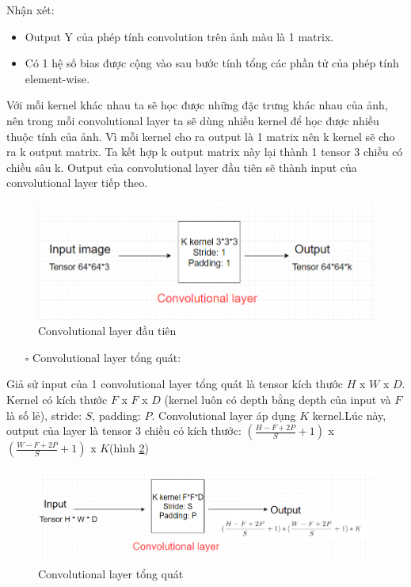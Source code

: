 Nhận xét:
\begin{itemize}
\item Output Y của phép tính convolution trên ảnh màu là 1 matrix.
\item Có 1 hệ số bias được cộng vào sau bước tính tổng các phần tử của phép tính element-wise.
\end{itemize}

Với mỗi kernel khác nhau ta sẽ học được những đặc trưng khác nhau của ảnh, nên trong mỗi convolutional layer ta sẽ dùng nhiều kernel để học được nhiều thuộc tính của ảnh. Vì mỗi kernel cho ra output là 1 matrix nên k kernel sẽ cho ra k output matrix. Ta kết hợp k output matrix này lại thành 1 tensor 3 chiều có chiều sâu k. Output của convolutional layer đầu tiên sẽ thành input của convolutional layer tiếp theo.

\FloatBarrier
\begin{figure}[htp]
\begin{center}
\includegraphics[scale=0.8]{chap2/c2_figs/15.png}
\end{center}
\caption{Convolutional layer đầu tiên}
\label{fig:conv-firstlayer}
\end{figure}
\FloatBarrier

\begin{itemize}
\item[$\square$] Convolutional layer tổng quát:
\end{itemize}
Giả sử input của 1 convolutional layer tổng quát là tensor kích thước $H$ x $W$ x $D$. Kernel có kích thước $F$ x $F$ x $D$ (kernel luôn có depth bằng depth của input và $F$ là số lẻ), stride: $S$, padding: $P$. Convolutional layer áp dụng $K$ kernel.Lúc này, output của layer là tensor 3 chiều có kích thước: $ (\frac{H-F+2P}{S} + 1)$ x $(\frac{W-F+2P}{S} + 1)$ x $K$(hình \ref{fig:conv-tongquat})

\FloatBarrier
\begin{figure}[htp]
\begin{center}
\includegraphics[scale=0.8]{chap2/c2_figs/16.png}
\end{center}
\caption{Convolutional layer tổng quát}
\label{fig:conv-tongquat}
\end{figure}
\FloatBarrier

